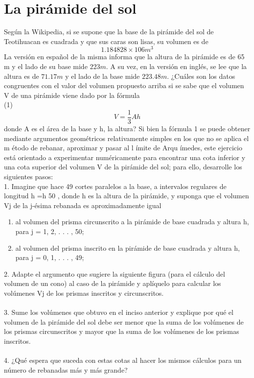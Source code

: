 \documentclass[12pt]{article}
\begin{document}
\section{La pirámide del sol}
Según la Wikipedia, si se supone que la base de la pirámide del sol de Teotihuacan es cuadrada y que sus caras son lisas, su volumen es de
\[
1.184828 × 106 m^3
\]
La versión en español de la misma informa que la altura de la pirámide es de 65 m y el lado de su base mide $223 m$. A su vez, en la versión en inglés, se lee que la altura es de $71.17 m$ y el lado de la base mide $223.48 m$. ¿Cuáles son los datos congruentes con el valor del volumen propuesto arriba si se sabe que el volumen V de una pirámide viene dado por la fórmula
\\
(1)\\
\[
V =\frac{1}{3}Ah 
\]
donde A es el  área de la base y h, la altura?
Si bien la fórmula 1 se puede obtener mediante argumentos geométricos relativamente simples
en los que no se aplica el m étodo de rebanar, aproximar y pasar al l ímite de Arqu ímedes, este ejercicio está orientado a experimentar numéricamente para encontrar una cota inferior y una cota superior del volumen V de la pirámide del sol; para ello, desarrolle los siguientes pasos:\\

1. Imagine que hace 49 cortes paralelos a la base, a intervalos regulares de longitud h =h
50 , donde h es la altura de la pirámide, y suponga que el volumen Vj de la j-ésima rebanada es aproximadamente igual
\begin{enumerate} 
\item al volumen del prisma circunscrito a la pirámide de base cuadrada y altura h, para
j = 1, 2, . . . , 50;
\item al volumen del prisma inscrito en la pirámide de base cuadrada y altura h, para
j = 0, 1, . . . , 49;\\
\end{enumerate} 
2. Adapte el argumento que sugiere la siguiente figura (para el cálculo del volumen de un cono) al caso de la pirámide y aplíquelo para calcular los volúmenes Vj de los prismas inscritos y circunscritos.\\ \\
3. Sume los volúmenes que obtuvo en el inciso anterior y explique por qué el volumen de la
pirámide del sol debe ser menor que la suma de los volúmenes de los prismas circunscritos y
mayor que la suma de los volúmenes de los prismas inscritos.\\ \\
4. ¿Qué espera que suceda con estas cotas al hacer los mismos cálculos para un número de
rebanadas más y más grande?
\end{document}
